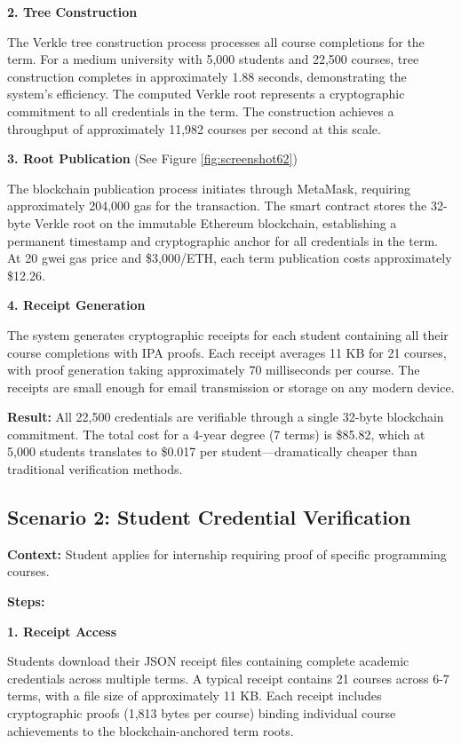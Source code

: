 \textbf{2. Tree Construction}

The Verkle tree construction process processes all course completions for the term. For a medium university with 5,000 students and 22,500 courses, tree construction completes in approximately 1.88 seconds, demonstrating the system's efficiency. The computed Verkle root represents a cryptographic commitment to all credentials in the term. The construction achieves a throughput of approximately 11,982 courses per second at this scale.

\textbf{3. Root Publication} (See Figure \ref{fig:screenshot62})

The blockchain publication process initiates through MetaMask, requiring approximately 204,000 gas for the transaction. The smart contract stores the 32-byte Verkle root on the immutable Ethereum blockchain, establishing a permanent timestamp and cryptographic anchor for all credentials in the term. At 20 gwei gas price and \$3,000/ETH, each term publication costs approximately \$12.26.

\textbf{4. Receipt Generation}

The system generates cryptographic receipts for each student containing all their course completions with IPA proofs. Each receipt averages 11 KB for 21 courses, with proof generation taking approximately 70 milliseconds per course. The receipts are small enough for email transmission or storage on any modern device.

\textbf{Result:} All 22,500 credentials are verifiable through a single 32-byte blockchain commitment. The total cost for a 4-year degree (7 terms) is \$85.82, which at 5,000 students translates to \$0.017 per student—dramatically cheaper than traditional verification methods.

\subsection{Scenario 2: Student Credential Verification}
\label{subsec:scenario-verification}

\textbf{Context:} Student applies for internship requiring proof of specific programming courses.

\textbf{Steps:}

\textbf{1. Receipt Access}

Students download their JSON receipt files containing complete academic credentials across multiple terms. A typical receipt contains 21 courses across 6-7 terms, with a file size of approximately 11 KB. Each receipt includes cryptographic proofs (1,813 bytes per course) binding individual course achievements to the blockchain-anchored term roots.

